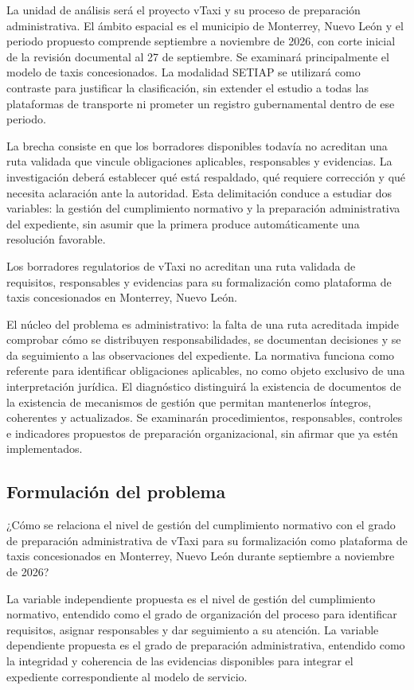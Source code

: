 {La unidad de análisis será el proyecto vTaxi y su proceso de preparación administrativa. El ámbito espacial es el municipio de Monterrey, Nuevo León y el periodo propuesto comprende septiembre a noviembre de 2026, con corte inicial de la revisión documental al 27 de septiembre. Se examinará principalmente el modelo de taxis concesionados. La modalidad SETIAP se utilizará como contraste para justificar la clasificación, sin extender el estudio a todas las plataformas de transporte ni prometer un registro gubernamental dentro de ese periodo.


La brecha consiste en que los borradores disponibles todavía no acreditan una ruta validada que vincule obligaciones aplicables, responsables y evidencias. La investigación deberá establecer qué está respaldado, qué requiere corrección y qué necesita aclaración ante la autoridad. Esta delimitación conduce a estudiar dos variables: la gestión del cumplimiento normativo y la preparación administrativa del expediente, sin asumir que la primera produce automáticamente una resolución favorable.


Los borradores regulatorios de vTaxi no acreditan una ruta validada de requisitos, responsables y evidencias para su formalización como plataforma de taxis concesionados en Monterrey, Nuevo León.


El núcleo del problema es administrativo: la falta de una ruta acreditada impide comprobar cómo se distribuyen responsabilidades, se documentan decisiones y se da seguimiento a las observaciones del expediente. La normativa funciona como referente para identificar obligaciones aplicables, no como objeto exclusivo de una interpretación jurídica. El diagnóstico distinguirá la existencia de documentos de la existencia de mecanismos de gestión que permitan mantenerlos íntegros, coherentes y actualizados. Se examinarán procedimientos, responsables, controles e indicadores propuestos de preparación organizacional, sin afirmar que ya estén implementados.


\subsection{Formulación del problema}
¿Cómo se relaciona el nivel de gestión del cumplimiento normativo con el grado de preparación administrativa de vTaxi para su formalización como plataforma de taxis concesionados en Monterrey, Nuevo León durante septiembre a noviembre de 2026?


La variable independiente propuesta es el nivel de gestión del cumplimiento normativo, entendido como el grado de organización del proceso para identificar requisitos, asignar responsables y dar seguimiento a su atención. La variable dependiente propuesta es el grado de preparación administrativa, entendido como la integridad y coherencia de las evidencias disponibles para integrar el expediente correspondiente al modelo de servicio.


}
